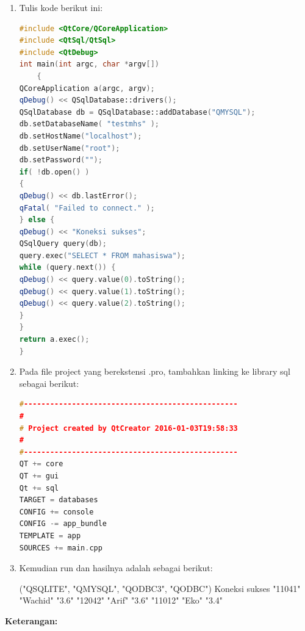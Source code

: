 \begin{enumerate}
\item
  Tulis kode berikut ini:


\begin{lstlisting}[language=c++, caption=Percobaan koneksi MySQL dengan QtConsole]
#include <QtCore/QCoreApplication>
#include <QtSql/QtSql>
#include <QtDebug>
int main(int argc, char *argv[])
    {
QCoreApplication a(argc, argv);
qDebug() << QSqlDatabase::drivers();
QSqlDatabase db = QSqlDatabase::addDatabase("QMYSQL");
db.setDatabaseName( "testmhs" );
db.setHostName("localhost");
db.setUserName("root");
db.setPassword("");
if( !db.open() )
{
qDebug() << db.lastError();
qFatal( "Failed to connect." );
} else {
qDebug() << "Koneksi sukses";
QSqlQuery query(db);
query.exec("SELECT * FROM mahasiswa");
while (query.next()) {
qDebug() << query.value(0).toString();
qDebug() << query.value(1).toString();
qDebug() << query.value(2).toString();
}
}
return a.exec();
}
\end{lstlisting}

\item
  Pada file project yang berekstensi .pro, tambahkan linking ke library
  sql sebagai berikut:
  
  \begin{lstlisting}[language=c++]
#-------------------------------------------------
#
# Project created by QtCreator 2016-01-03T19:58:33
#
#-------------------------------------------------
QT += core
QT += gui
Qt += sql
TARGET = databases
CONFIG += console
CONFIG -= app_bundle
TEMPLATE = app
SOURCES += main.cpp
  \end{lstlisting}
\item
  Kemudian run dan hasilnya adalah sebagai berikut:

\begin{lcverbatim}
("QSQLITE", "QMYSQL", "QODBC3", "QODBC")
Koneksi sukses
"11041"
"Wachid"
"3.6"
"12042"
"Arif"
"3.6"
"11012"
"Eko"
"3.4"
\end{lcverbatim}
\end{enumerate}

\textbf{Keterangan:}

